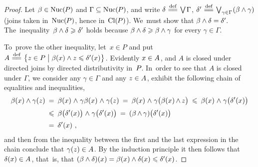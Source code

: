 \documentclass[11pt,letterpaper]{article}
\renewcommand{\thmskip}{\bigskip}
\begin{document}
\begin{proof}
Let $\beta\in\mathop{\smash{\mathrm{Nuc}}}\nolimits(\mspace{-1mu} P)$ and $\Gamma\subseteq\mathop{\smash{\mathrm{Nuc}}}\nolimits(\mspace{-1mu} P)$,
and write $\delta \mathrel{\overset{\text{def}}{\mspace{1mu}=\!=\mspace{1mu}}} \bigvee\mspace{-1mu}\Gamma$,
	$\delta' \mathrel{\overset{\text{def}}{\mspace{1mu}=\!=\mspace{1mu}}} \bigvee_{\gamma\in\Gamma\mspace{1mu}}(\beta\wedge\gamma)$
{\large(}joins taken in~$\mathop{\smash{\mathrm{Nuc}}}\nolimits(\mspace{-1mu} P)$, hence in~$\mathop{\smash{\mathrm{Cl}}}\nolimits(\mspace{-1mu} P)${\large)}.
We~must show that $\beta\wedge\delta = \delta'\mspace{-2mu}$.
The~inequal\-ity~$\beta\wedge\delta \geqslant \delta' $
holds because $\beta\meet\delta \geq\nolinebreak \beta\meet\nolinebreak\gamma$
for every $\gamma\in\Gamma$.

To~prove the other inequality,
let~$x\in P$ and put
	$A \mathrel{\overset{\text{def}}{\mspace{1mu}=\!=\mspace{1mu}}} \bigl\{ z\in P\bigm| \beta(x)\wedge z \leqslant \delta' (x) \bigr\}\mspace{1mu}$.
Evidently $x\in A\mspace{1mu}$,
	and $A$ is closed under directed joins by directed distributivity in~$P\mspace{-1mu}$.
In~order to see that $A$ is closed under $\Gamma$,
we consider any $\gamma\in\Gamma$ and any $z\in A\mspace{1mu}$,
exhibit the following chain of equalities and inequalities,
%
\begin{align*}
\beta(x) \wedge \gamma(z)
	&\:=\: \beta(x) \mspace{1mu}\wedge\mspace{1mu} \gamma\beta(x) \mspace{1mu}\wedge\mspace{1mu} \gamma(z)
		\:=\: \beta(x) \mspace{1mu}\wedge\mspace{1mu} \gamma\bigl(\beta(x)\mspace{-1mu}\wedge\mspace{-1mu} z\bigr)
		\:\leqslant\: \beta(x) \mspace{1mu}\wedge\mspace{1mu} \gamma\bigl(\delta'(x)\bigr) \\[.5ex]
	&\:\leqslant\: \beta\bigl(\delta'(x)\bigr) \mspace{1mu}\wedge\mspace{1mu} \gamma\bigl(\delta'(x)\bigr)
		\:=\: (\beta\mspace{-1mu}\wedge\mspace{-1mu}\gamma)\bigl(\delta'(x)\bigr) \\[.5ex]
	&\:=\: \delta'(x)~,
\end{align*}
%
and then from the inequality between the first and the last expression in the chain
	conclude that $\gamma(z)\in A\mspace{1mu}$.
By the induction principle it then follows that $\delta(x)\in A\mspace{1mu}$,
that~is, that $(\beta\wedge\delta)(x) = \beta(x)\wedge\delta(x) \leqslant \delta' (x)\mspace{1mu}$.
\end{proof}

\thmskip
\end{document}
